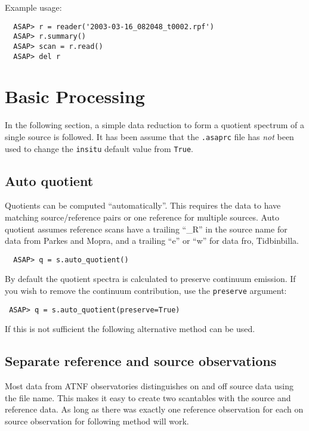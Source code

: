 \documentclass[11pt]{article}
\newcommand{\cmd}[1]{{\tt #1}}
\begin{document}
Example usage:

\begin{verbatim}
  ASAP> r = reader('2003-03-16_082048_t0002.rpf')
  ASAP> r.summary()
  ASAP> scan = r.read()
  ASAP> del r
\end{verbatim}

\section{Basic Processing}

In the following section, a simple data reduction to form a quotient
spectrum of a single source is followed.  It has been assume that the
\cmd{.asaprc} file has {\em not} been used to change the \cmd{insitu}
default value from \cmd{True}.

\subsection{Auto quotient}
Quotients can be computed ``automatically''. This
requires the data to have matching source/reference pairs or one
reference for multiple sources. Auto quotient assumes reference scans
have a trailing ``\_R'' in the source name for data from Parkes and
Mopra, and a trailing ``e'' or ``w'' for data fro, Tidbinbilla.

\begin{verbatim}
  ASAP> q = s.auto_quotient()
\end{verbatim}

By default the quotient spectra is calculated
to preserve continuum emission. If you wish to remove the continuum
contribution, use the \cmd{preserve} argument:

\begin{verbatim}
 ASAP> q = s.auto_quotient(preserve=True)
\end{verbatim}

If this is not sufficient the following alternative method can be used.

\subsection{Separate reference and source observations}

Most data from ATNF observatories
distinguishes on and off source data using the file name. This makes
it easy to create two scantables with the source and reference
data. As long as there was exactly one reference observation for each
on source observation for following method will work.
\end{document}

